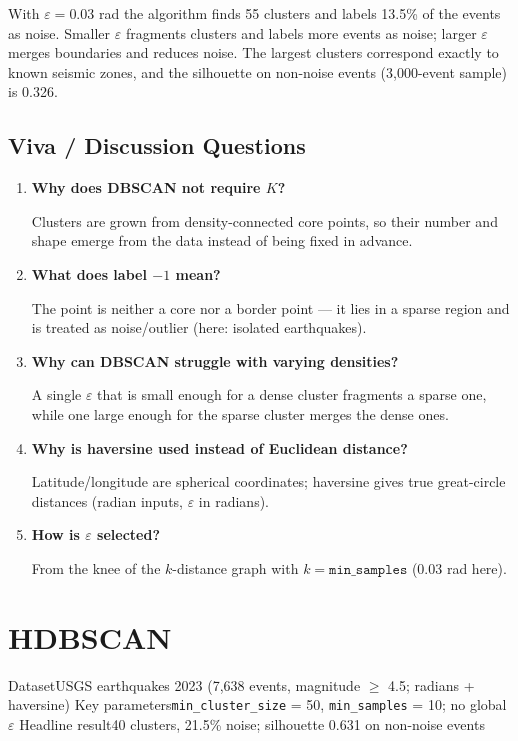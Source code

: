 With $\varepsilon = 0.03$ rad the algorithm finds 55 clusters and labels 13.5\% of the events
as noise. Smaller $\varepsilon$ fragments clusters and labels more events as noise; larger
$\varepsilon$ merges boundaries and reduces noise. The largest clusters correspond exactly to
known seismic zones, and the silhouette on non-noise events (3,000-event sample) is 0.326.

\section{Viva / Discussion Questions}
\begin{enumerate}
  \item \textbf{Why does DBSCAN not require $K$?}\par\nobreak Clusters are grown from density-connected core
  points, so their number and shape emerge from the data instead of being fixed in advance.
  \item \textbf{What does label $-1$ mean?}\par\nobreak The point is neither a core nor a border point --- it lies
  in a sparse region and is treated as noise/outlier (here: isolated earthquakes).
  \item \textbf{Why can DBSCAN struggle with varying densities?}\par\nobreak A single $\varepsilon$ that is small
  enough for a dense cluster fragments a sparse one, while one large enough for the sparse
  cluster merges the dense ones.
  \item \textbf{Why is haversine used instead of Euclidean distance?}\par\nobreak Latitude/longitude are
  spherical coordinates; haversine gives true great-circle distances (radian inputs,
  $\varepsilon$ in radians).
  \item \textbf{How is $\varepsilon$ selected?}\par\nobreak From the knee of the $k$-distance graph with
  $k = \texttt{min\_samples}$ (0.03 rad here).
\end{enumerate}


\chapter{HDBSCAN}\label{exp:06}


\quickfacts
  {Dataset}{USGS earthquakes 2023 (7,638 events, magnitude $\ge$ 4.5; radians + haversine)}
  {Key parameters}{\texttt{min\_cluster\_size} = 50, \texttt{min\_samples} = 10; no global $\varepsilon$}
  {Headline result}{40 clusters, 21.5\% noise; silhouette 0.631 on non-noise events}


